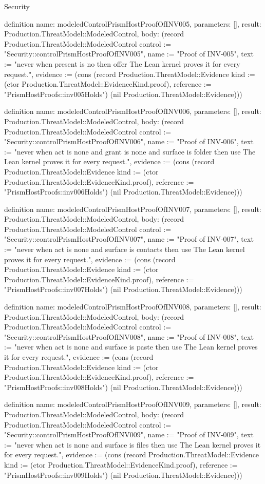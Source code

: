 \begin{lexlean}{Security}
\begin{semanticmodule}
definition{
  name: modeledControlPrismHostProofOfINV005,
  parameters: [],
  result: Production.ThreatModel::ModeledControl,
  body: (record Production.ThreatModel::ModeledControl {control := "Security::controlPrismHostProofOfINV005", name := "Proof of INV-005", text := "never when present is no then offer The Lean kernel proves it for every request.", evidence := (cons (record Production.ThreatModel::Evidence {kind := (ctor Production.ThreatModel::EvidenceKind.proof), reference := "PrismHostProofs::inv005Holds"}) (nil Production.ThreatModel::Evidence))})
}

definition{
  name: modeledControlPrismHostProofOfINV006,
  parameters: [],
  result: Production.ThreatModel::ModeledControl,
  body: (record Production.ThreatModel::ModeledControl {control := "Security::controlPrismHostProofOfINV006", name := "Proof of INV-006", text := "never when act is none and grant is none and surface is folder then use The Lean kernel proves it for every request.", evidence := (cons (record Production.ThreatModel::Evidence {kind := (ctor Production.ThreatModel::EvidenceKind.proof), reference := "PrismHostProofs::inv006Holds"}) (nil Production.ThreatModel::Evidence))})
}

definition{
  name: modeledControlPrismHostProofOfINV007,
  parameters: [],
  result: Production.ThreatModel::ModeledControl,
  body: (record Production.ThreatModel::ModeledControl {control := "Security::controlPrismHostProofOfINV007", name := "Proof of INV-007", text := "never when act is none and surface is contacts then use The Lean kernel proves it for every request.", evidence := (cons (record Production.ThreatModel::Evidence {kind := (ctor Production.ThreatModel::EvidenceKind.proof), reference := "PrismHostProofs::inv007Holds"}) (nil Production.ThreatModel::Evidence))})
}

definition{
  name: modeledControlPrismHostProofOfINV008,
  parameters: [],
  result: Production.ThreatModel::ModeledControl,
  body: (record Production.ThreatModel::ModeledControl {control := "Security::controlPrismHostProofOfINV008", name := "Proof of INV-008", text := "never when act is none and surface is paste then use The Lean kernel proves it for every request.", evidence := (cons (record Production.ThreatModel::Evidence {kind := (ctor Production.ThreatModel::EvidenceKind.proof), reference := "PrismHostProofs::inv008Holds"}) (nil Production.ThreatModel::Evidence))})
}

definition{
  name: modeledControlPrismHostProofOfINV009,
  parameters: [],
  result: Production.ThreatModel::ModeledControl,
  body: (record Production.ThreatModel::ModeledControl {control := "Security::controlPrismHostProofOfINV009", name := "Proof of INV-009", text := "never when act is none and surface is files then use The Lean kernel proves it for every request.", evidence := (cons (record Production.ThreatModel::Evidence {kind := (ctor Production.ThreatModel::EvidenceKind.proof), reference := "PrismHostProofs::inv009Holds"}) (nil Production.ThreatModel::Evidence))})
}


\end{semanticmodule}
\end{lexlean}
